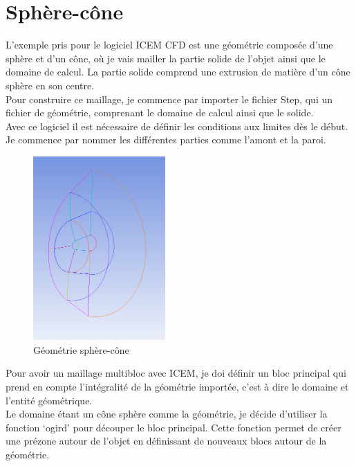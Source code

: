 \section{ Sphère-cône}

L'exemple pris pour le logiciel ICEM CFD est une géométrie composée d'une sphère et d'un cône, où je vais mailler la partie solide de l'objet ainsi que le domaine de calcul. La partie solide comprend une extrusion de matière d'un cône sphère en son centre.\\
Pour construire ce maillage, je commence par importer le fichier Step, qui un fichier de géométrie, comprenant le domaine de calcul ainsi que le solide.\\

Avec ce logiciel il est nécessaire de définir les conditions aux limites dès le début. Je commence par nommer les différentes parties comme l'amont et la paroi.


\begin{figure}[H]
\begin{center}
\includegraphics[width=0.45\textwidth]{chapter1_introduction/pictures/icem/castest_fluid_solid/geo1.PNG}
\caption{Géométrie sphère-cône}
\end{center}
\end{figure}

Pour avoir un maillage multibloc avec ICEM, je doi définir un bloc principal qui prend en compte l'intégralité de la géométrie importée, c'est à dire le domaine et l'entité géométrique.\\
Le domaine étant un cône sphère comme la géométrie, je décide d'utiliser la fonction ‘ogird’ pour découper le bloc principal. Cette fonction permet de créer une prézone autour de l'objet en définissant de nouveaux blocs autour de la géométrie.\\

